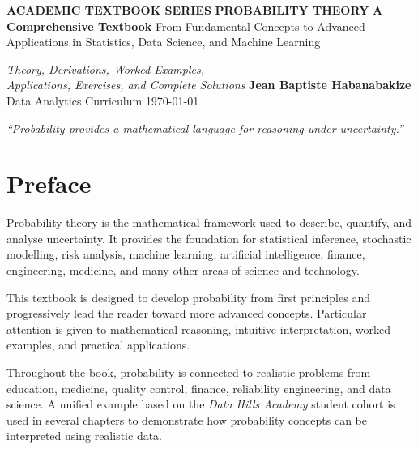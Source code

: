 \documentclass[12pt,a4paper,oneside]{report}
\theoremstyle{mytheorem}
\theoremstyle{mydefinition}
\theoremstyle{myremark}
\begin{document}

\begin{titlepage}
\centering
\vspace*{1.5cm}
{\Large\bfseries ACADEMIC TEXTBOOK SERIES}
\vspace{1.5cm}
{\Huge\bfseries\color{myblue} PROBABILITY THEORY}
\vspace{0.5cm}
{\Large\bfseries A Comprehensive Textbook}
\vspace{0.8cm}
{\large From Fundamental Concepts to Advanced Applications in Statistics, Data Science, and Machine Learning}
\vspace{1.2cm}
\vspace{1.2cm}
{\large \textit{Theory, Derivations, Worked Examples,\\ Applications, Exercises, and Complete Solutions}}
\vfill
{\Large \textbf{Jean Baptiste Habanabakize}}
\vspace{0.3cm}
{\large Data Analytics Curriculum}
\vspace{0.8cm}
{\large \today}
\vfill
\begin{minipage}{0.78\textwidth}
\centering\small
\textit{``Probability provides a mathematical language for reasoning under uncertainty.''}
\end{minipage}
\end{titlepage}

\chapter*{Preface}

Probability theory is the mathematical framework used to describe, quantify, and analyse uncertainty. It provides the foundation for statistical inference, stochastic modelling, risk analysis, machine learning, artificial intelligence, finance, engineering, medicine, and many other areas of science and technology.

This textbook is designed to develop probability from first principles and progressively lead the reader toward more advanced concepts. Particular attention is given to mathematical reasoning, intuitive interpretation, worked examples, and practical applications.

Throughout the book, probability is connected to realistic problems from education, medicine, quality control, finance, reliability engineering, and data science. A unified example based on the \textit{Data Hills Academy} student cohort is used in several chapters to demonstrate how probability concepts can be interpreted using realistic data.
\end{document}
